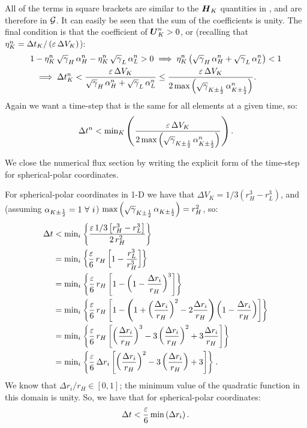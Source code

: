 \documentclass[10pt,preprint]{aastex}
\begin{document}
All of the terms in square brackets are similar to the $\boldsymbol{H}_{K}$ quantities in \citet{Qin2016}, and are therefore in $\mathcal{G}$. It can easily be seen that the sum of the coefficients is unity. The final condition is that the coefficient of $\boldsymbol{U}^{n}_{K}>0$, or (recalling that $\eta^{n}_{K}=\Delta t_{K}/\left(\varepsilon\,\Delta V_{K}\right)$):
\begin{align}
    1&-\eta^{n}_{K}\,\sqrt{\gamma}_{H}\,\alpha^{n}_{H}-\eta^{n}_{K}\,\sqrt{\gamma}_{L}\,\alpha^{n}_{L}>0\implies\eta^{n}_{K}\left(\sqrt{\gamma}_{H}\,\alpha^{n}_{H}+\sqrt{\gamma}_{L}\,\alpha^{n}_{L}\right)<1\\
    &\implies\Delta t^{n}_{K}<\frac{\varepsilon\,\Delta V_{K}}{\sqrt{\gamma}_{H}\,\alpha^{n}_{H}+\sqrt{\gamma}_{L}\,\alpha^{n}_{L}}\leq\frac{\varepsilon\,\Delta V_{K}}{2\,\text{max}\left(\sqrt{\gamma}_{K\pm\frac{1}{2}}\,\alpha^{n}_{K\pm\frac{1}{2}}\right)}.
\end{align}
Again we want a time-step that is the same for all elements at a given time, so:
\begin{equation}
    \Delta t^{n}<\text{min}_{K}\left(\frac{\varepsilon\,\Delta V_{K}}{2\,\text{max}\left(\sqrt{\gamma}_{K\pm\frac{1}{2}}\,\alpha^{n}_{K\pm\frac{1}{2}}\right)}\right).
\end{equation}

We close the numerical flux section by writing the explicit form of the time-step for spherical-polar coordinates.

For spherical-polar coordinates in 1-D we have that $\Delta V_{K}=1/3\left(r_{H}^{3}-r_{L}^{3}\right)$, and (assuming $\alpha_{K\pm\f{1}{2}}=1\ \forall\ i$) $\text{max}\left(\sqrt{\gamma}_{K\pm\frac{1}{2}}\,\alpha_{K\pm\frac{1}{2}}\right)=r_{H}^{2}$, so:
\begin{align}
    \Delta t&<\text{min}_{i}\left\{\frac{\varepsilon\,1/3\left[r_{H}^{3}-r_{L}^{3}\right]}{2\,r_{H}^{2}}\right\}\\
    &=\text{min}_{i}\left\{\frac{\varepsilon}{6}\,r_{H}\left[1-\frac{r_{L}^{3}}{r_{H}^{3}}\right]\right\}\\
    &=\text{min}_{i}\left\{\frac{\varepsilon}{6}\,r_{H}\left[1-\left(1-\frac{\Delta r_{i}}{r_{H}}\right)^{3}\right]\right\}\\
    &=\text{min}_{i}\left\{\frac{\varepsilon}{6}\,r_{H}\left[1-\left(1+\left(\frac{\Delta r_{i}}{r_{H}}\right)^{2}-2\frac{\Delta r_{i}}{r_{H}}\right)\left(1-\frac{\Delta r_{i}}{r_{H}}\right)\right]\right\}\\
    &=\text{min}_{i}\left\{\frac{\varepsilon}{6}\,r_{H}\left[\left(\frac{\Delta r_{i}}{r_{H}}\right)^{3}-3\left(\frac{\Delta r_{i}}{r_{H}}\right)^{2}+3\frac{\Delta r_{i}}{r_{H}}\right]\right\}\\
    &=\text{min}_{i}\left\{\frac{\varepsilon}{6}\,\Delta r_{i}\left[\left(\frac{\Delta r_{i}}{r_{H}}\right)^{2}-3\left(\frac{\Delta r_{i}}{r_{H}}\right)+3\right]\right\}.
\end{align}
We know that $\Delta r_{i}/r_{H}\in\left[0,1\right]$; the minimum value of the quadratic function in this domain is unity. So, we have that for spherical-polar coordinates:
\begin{equation}
    \Delta t<\frac{\varepsilon}{6}\,\text{min}\left(\Delta r_{i}\right).
\end{equation}
\end{document}
